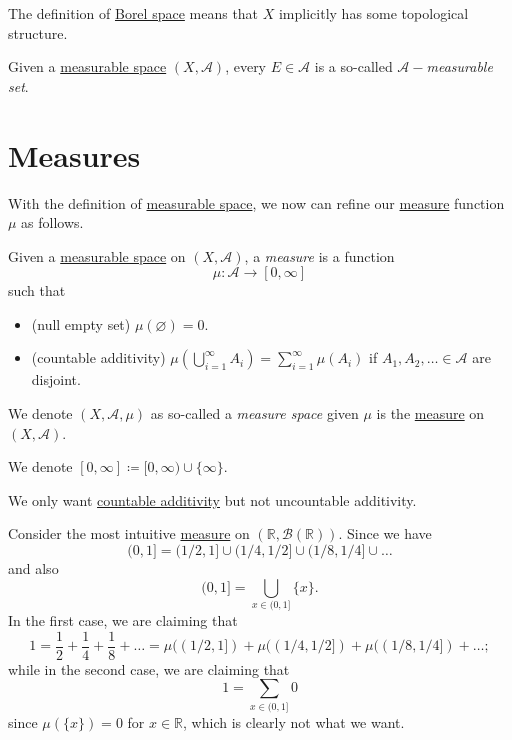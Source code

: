 \begin{remark}
	The definition of \hyperref[def:Borel-space]{Borel space} means that \(X\) implicitly has some topological structure.
\end{remark}

\begin{definition}\label{def:measurable-set}
	Given a \hyperref[def:measurable-space]{measurable space} \((X, \mathcal{A} )\), every \(E\in \mathcal{A} \) is a so-called
	\emph{\(\mathcal{A}-\)measurable set}.
\end{definition}

\section{Measures}
With the definition of \hyperref[def:measurable-space]{measurable space}, we now can refine our \hyperref[def:measure]{measure} function \(\mu\) as follows.
\begin{definition}[Measure]\label{def:measure}
	Given a \hyperref[def:measurable-space]{measurable space} on \((X, \mathcal{A}) \), a \emph{measure} is a function
	\[
		\mu\colon \mathcal{A} \to [0, \infty]
	\]
	such that
	\begin{itemize}
		\item\label{def:measure-null-empty-set}(null empty set) \(\mu(\varnothing ) = 0\).
		\item\label{def:measure-countable-additivity}(countable additivity) \(\mu\left(\bigcup_{i=1}^{\infty} A_{i}\right) = \sum_{i=1}^{\infty}\mu(A_{i})\) if \(A_1, A_2, \dots \in \mathcal{A}\)
		      are disjoint.
	\end{itemize}
\end{definition}

\begin{definition}\label{def:measure-space}
	We denote \((X, \mathcal{A} , \mu)\) as so-called a \emph{measure space} given \(\mu\) is the \hyperref[def:measure]{measure} on \((X, \mathcal{A} )\).
\end{definition}

\begin{notation}
	We denote \([0, \infty] \coloneqq [0, \infty) \cup \{\infty\}\).
\end{notation}

\begin{remark}
	We only want \hyperref[def:measure-countable-additivity]{countable additivity} but not uncountable additivity.
\end{remark}
\begin{explanation}
	Consider the most intuitive \hyperref[def:measure]{measure} on \((\mathbb{R} , \mathcal{B} (\mathbb{R}))\). Since we have
	\[
		(0, 1] = (1 / 2, 1]\cup (1 / 4, 1 / 2]\cup (1 / 8, 1 / 4]\cup \dots
	\]
	and also
	\[
		(0, 1] = \bigcup_{x\in (0, 1]}\{x\}.
	\]
	In the first case, we are claiming that
	\[
		1
		= \frac{1}{2} + \frac{1}{4} + \frac{1}{8} + \dots
		= \mu((1 / 2, 1]) + \mu((1 / 4, 1 / 2]) + \mu((1 / 8, 1 / 4]) + \dots ;
	\]
	while in the second case, we are claiming that
	\[
		1 = \sum_{x\in(0, 1]} 0
	\]
	since \(\mu(\{ x \} ) = 0\) for \(x\in \mathbb{R} \), which is clearly not what we want.
\end{explanation}

